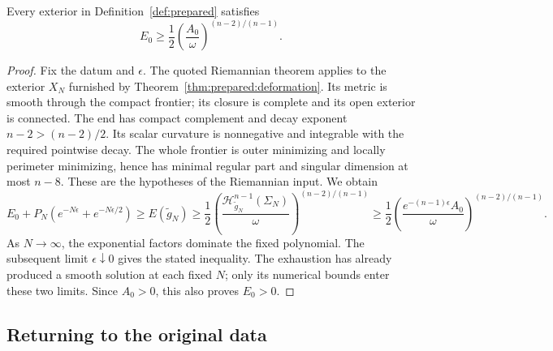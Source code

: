 \begin{theorem}
\label{thm:numerical:prepared}
Every exterior in Definition~\ref{def:prepared} satisfies
\begin{equation}\label{eq:height:prepared-inequality}
 E_0\ge\frac12\left(\frac{A_0}{\omega}\right)^{(n-2)/(n-1)}.
\end{equation}
\end{theorem}
\begin{proof}
Fix the datum and $\epsilon$. The quoted Riemannian theorem applies to
the exterior $X_N$ furnished by
Theorem~\ref{thm:prepared:deformation}. Its metric is smooth through the
compact frontier; its closure is complete and its open exterior is
connected. The end has compact complement and decay exponent
$n-2>(n-2)/2$. Its scalar curvature is nonnegative and integrable with
the required pointwise decay. The whole frontier is outer minimizing
and locally perimeter minimizing, hence has minimal regular part and
singular dimension at most $n-8$. These are the hypotheses of the Riemannian input.
We obtain
\[
 E_0+P_N(e^{-N\epsilon}+e^{-N\epsilon/2})
 \ge E(\widetilde g_N)
 \ge\frac12\left(
 \frac{\mathcal H^{n-1}_{\widetilde g_N}(\Sigma_N)}\omega
 \right)^{(n-2)/(n-1)}
 \ge\frac12\left(\frac{e^{-(n-1)\epsilon}A_0}\omega
 \right)^{(n-2)/(n-1)}.
\]
As $N\to\infty$, the exponential factors dominate the fixed polynomial.
The subsequent limit $\epsilon\downarrow0$ gives the stated inequality.
The exhaustion has already produced a smooth solution at each fixed $N$;
only its numerical bounds enter these two limits.
Since $A_0>0$, this also proves $E_0>0$.
\end{proof}

\subsection{Returning to the original data}

